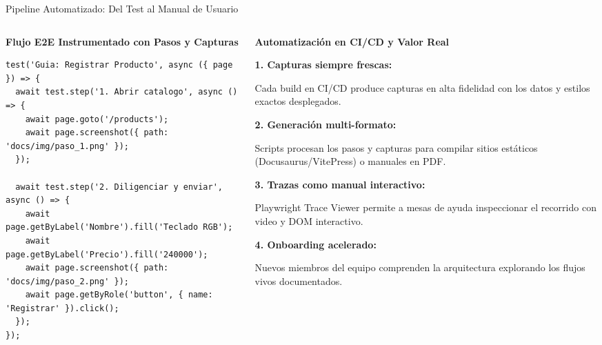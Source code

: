\documentclass[aspectratio=169]{beamer}
\begin{document}
\begin{frame}[fragile]{Pipeline Automatizado: Del Test al Manual de Usuario}
  \begin{columns}[T,onlytextwidth]
    \begin{column}{0.49\textwidth}
      \textbf{\scriptsize\color{cbDark} Flujo E2E Instrumentado con Pasos y Capturas}
      \begin{lstlisting}[style=tslst,basicstyle=\ttfamily\fontsize{5.2pt}{6.3pt}\selectfont,aboveskip=3pt,belowskip=2pt]
test('Guia: Registrar Producto', async ({ page }) => {
  await test.step('1. Abrir catalogo', async () => {
    await page.goto('/products');
    await page.screenshot({ path: 'docs/img/paso_1.png' });
  });

  await test.step('2. Diligenciar y enviar', async () => {
    await page.getByLabel('Nombre').fill('Teclado RGB');
    await page.getByLabel('Precio').fill('240000');
    await page.screenshot({ path: 'docs/img/paso_2.png' });
    await page.getByRole('button', { name: 'Registrar' }).click();
  });
});
      \end{lstlisting}
    \end{column}
    \begin{column}{0.49\textwidth}
      \begin{tcolorbox}[colback=cbWhite,colframe=cbBorder,arc=4pt,top=4pt,bottom=4pt,left=5pt,right=5pt]
        {\footnotesize\bfseries\color{cbBlue} Automatización en CI/CD y Valor Real}\par
        \vspace{0.1cm}
        {\scriptsize
        \textbf{1. Capturas siempre frescas:}\par
        Cada build en CI/CD produce capturas en alta fidelidad con los datos y estilos exactos desplegados.\par\vspace{0.08cm}
        \textbf{2. Generación multi-formato:}\par
        Scripts procesan los pasos y capturas para compilar sitios estáticos (Docusaurus/VitePress) o manuales en PDF.\par\vspace{0.08cm}
        \textbf{3. Trazas como manual interactivo:}\par
        Playwright Trace Viewer permite a mesas de ayuda inspeccionar el recorrido con video y DOM interactivo.\par\vspace{0.08cm}
        \textbf{4. Onboarding acelerado:}\par
        Nuevos miembros del equipo comprenden la arquitectura explorando los flujos vivos documentados.\par
        }
      \end{tcolorbox}
    \end{column}
  \end{columns}
\end{frame}
\end{document}
